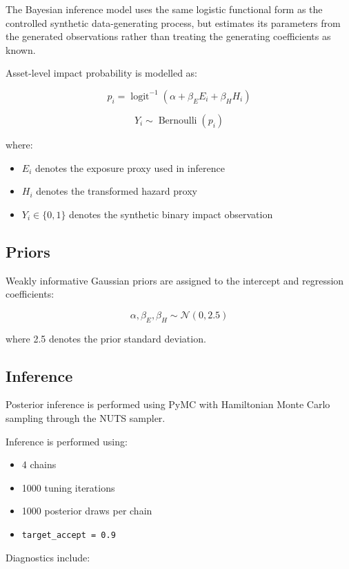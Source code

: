 \documentclass[
]{article}
\providecommand{\tightlist}{%
  \setlength{\itemsep}{0pt}\setlength{\parskip}{0pt}}
\begin{document}
The Bayesian inference model uses the same logistic functional form as
the controlled synthetic data-generating process, but estimates its
parameters from the generated observations rather than treating the
generating coefficients as known.

Asset-level impact probability is modelled as:

\[
p_i =
\operatorname{logit}^{-1}
\left(
\alpha + \beta_E E_i + \beta_H H_i
\right)
\]

\[
Y_i \sim \operatorname{Bernoulli}(p_i)
\]

where:

\begin{itemize}
\tightlist
\item
  \(E_i\) denotes the exposure proxy used in inference
\item
  \(H_i\) denotes the transformed hazard proxy
\item
  \(Y_i \in \{0,1\}\) denotes the synthetic binary impact observation
\end{itemize}

\subsection{Priors}\label{priors}

Weakly informative Gaussian priors are assigned to the intercept and
regression coefficients:

\[
\alpha, \beta_E, \beta_H \sim \mathcal{N}(0, 2.5)
\]

where 2.5 denotes the prior standard deviation.

\subsection{Inference}\label{inference}

Posterior inference is performed using PyMC with Hamiltonian Monte Carlo
sampling through the NUTS sampler.

Inference is performed using:

\begin{itemize}
\tightlist
\item
  4 chains
\item
  1000 tuning iterations
\item
  1000 posterior draws per chain
\item
  \texttt{target\_accept\ =\ 0.9}
\end{itemize}

Diagnostics include:
\end{document}
